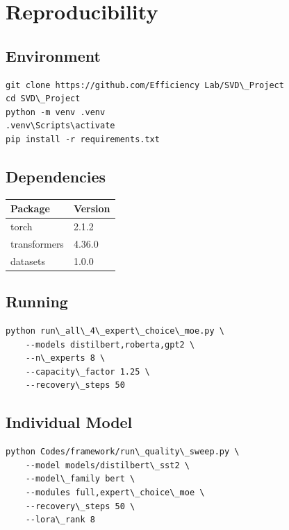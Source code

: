 \section{Reproducibility}

\subsection{Environment}

\begin{lstlisting}
git clone https://github.com/Efficiency Lab/SVD\_Project
cd SVD\_Project
python -m venv .venv
.venv\Scripts\activate
pip install -r requirements.txt
\end{lstlisting}

\subsection{Dependencies}

\begin{table}[H]
\centering
\small
\begin{tabular}{ll}
\toprule
\textbf{Package} & \textbf{Version} \\
\midrule
torch & 2.1.2 \\
transformers & 4.36.0 \\
datasets & 1.0.0 \\
\bottomrule
\end{tabular}
\end{table}

\subsection{Running}

\begin{lstlisting}
python run\_all\_4\_expert\_choice\_moe.py \
    --models distilbert,roberta,gpt2 \
    --n\_experts 8 \
    --capacity\_factor 1.25 \
    --recovery\_steps 50
\end{lstlisting}

\subsection{Individual Model}

\begin{lstlisting}
python Codes/framework/run\_quality\_sweep.py \
    --model models/distilbert\_sst2 \
    --model\_family bert \
    --modules full,expert\_choice\_moe \
    --recovery\_steps 50 \
    --lora\_rank 8
\end{lstlisting}

